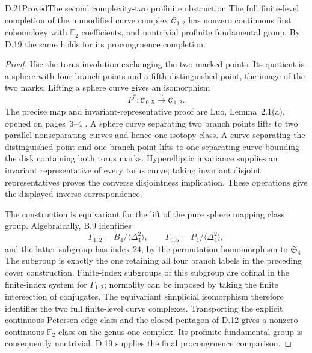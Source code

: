 \begin{result}{D.21}{Proved}{The second complexity-two profinite obstruction}
The full finite-level completion of the unmodified curve complex $\mathcal C_{1,2}$ has nonzero continuous first cohomology with $\mathbb F_2$ coefficients, and nontrivial profinite fundamental group. By D.19 the same holds for its procongruence completion.
\end{result}
\begin{proof}
Use the torus involution exchanging the two marked points. Its quotient is a sphere with four branch points and a fifth distinguished point, the image of the two marks. Lifting a sphere curve gives an isomorphism
\[
 P^*:\mathcal C_{0,5}\xrightarrow{\sim}\mathcal C_{1,2}.
\]
The precise map and invariant-representative proof are Luo, Lemma~2.1(a), opened on pages~3--4 \cite{D_Luo2000}. A sphere curve separating two branch points lifts to two parallel nonseparating curves and hence one isotopy class. A curve separating the distinguished point and one branch point lifts to one separating curve bounding the disk containing both torus marks. Hyperelliptic invariance supplies an invariant representative of every torus curve; taking invariant disjoint representatives proves the converse disjointness implication. These operations give the displayed inverse correspondence.

The construction is equivariant for the lift of the pure sphere mapping class group. Algebraically, B.9 identifies
\[
 \Gamma_{1,2}=B_4/\langle\Delta_4^2\rangle,\qquad
 \Gamma_{0,5}=P_4/\langle\Delta_4^2\rangle,
\]
and the latter subgroup has index $24$, by the permutation homomorphism to $\mathfrak S_4$. The subgroup is exactly the one retaining all four branch labels in the preceding cover construction. Finite-index subgroups of this subgroup are cofinal in the finite-index system for $\Gamma_{1,2}$; normality can be imposed by taking the finite intersection of conjugates. The equivariant simplicial isomorphism therefore identifies the two full finite-level curve complexes. Transporting the explicit continuous Petersen-edge class and the closed pentagon of D.12 gives a nonzero continuous $\mathbb F_2$ class on the genus-one complex. Its profinite fundamental group is consequently nontrivial. D.19 supplies the final procongruence comparison.
\end{proof}
